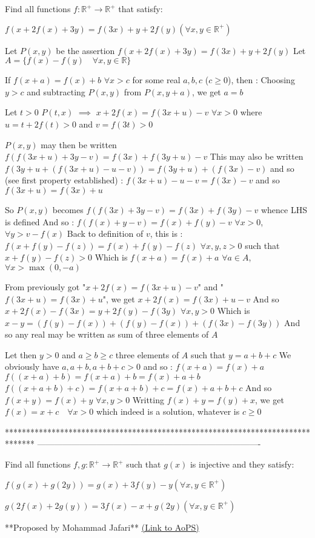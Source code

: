 \begin{solution}
	\begin{tcolorbox}Find all functions $f: \mathbb{R}^{+} \to \mathbb{R}^{+}$ that satisfy:

$f(x+2f(x)+3y)=f(3x)+y+2f(y) (\forall x,y \in \mathbb{R}^{+})$\end{tcolorbox}
Let $P(x,y)$ be the assertion $f(x+2f(x)+3y)=f(3x)+y+2f(y)$
Let $A=\{f(x)-f(y)\quad\forall x,y\in\mathbb R\}$

If $f(x+a)=f(x)+b$ $\forall x>c$ for some real $a,b,c$ ($c\ge 0$), then :
Choosing $y>c$ and subtracting $P(x,y)$ from $P(x,y+a)$, we get $a=b$

Let $t>0$
$P(t,x)$ $\implies$ $x+2f(x)=f(3x+u)-v$ $\forall x>0$ where $u=t+2f(t)>0$ and $v=f(3t)>0$

$P(x,y)$ may then be written $f(f(3x+u)+3y-v)=f(3x)+f(3y+u)-v$
This may also be written $f(3y+u +(f(3x+u)-u-v))=f(3y+u)+(f(3x)-v)$ and so (see first property established) :
$f(3x+u)-u-v=f(3x)-v$ and so $f(3x+u)=f(3x)+u$

So $P(x,y)$ becomes $f(f(3x)+3y-v)=f(3x)+f(3y)-v$ whence LHS is defined
And so : $f(f(x)+y-v)=f(x)+f(y)-v$ $\forall x>0$, $\forall y>v-f(x)$
Back to definition of $v$, this is :
$f(x+f(y)-f(z))=f(x)+f(y)-f(z)$ $\forall x,y,z>0$ such that $x+f(y)-f(z)>0$
Which is $f(x+a)=f(x)+a$ $\forall a\in A$, $\forall x>\max(0,-a)$

From previously got "$x+2f(x)=f(3x+u)-v$" and "$f(3x+u)=f(3x)+u$", we get $x+2f(x)=f(3x)+u-v$
And so $x+2f(x)-f(3x)=y+2f(y)-f(3y)$ $\forall x,y>0$
Which is $x-y=(f(y)-f(x))+(f(y)-f(x))+(f(3x)-f(3y))$ 
And so any real may be written as sum of three elements of $A$

Let then $y>0$ and $a\ge b\ge c$ three elements of $A$ such that $y=a+b+c$
We obviously have $a,a+b,a+b+c>0$ and so :
$f(x+a)=f(x)+a$
$f((x+a)+b)=f(x+a)+b=f(x)+a+b$
$f((x+a+b)+c)=f(x+a+b)+c=f(x)+a+b+c$
And so $f(x+y)=f(x)+y$ $\forall x,y>0$
Writting $f(x)+y=f(y)+x$, we get 
$\boxed{f(x)=x+c\quad\forall x>0}$ which indeed is a solution, whatever is $c\ge 0$



\end{solution}
*******************************************************************************
-------------------------------------------------------------------------------

\begin{problem}
	Find all functions $f,g:\mathbb{R}^{+} \to \mathbb{R}^{+}$ such that $g(x)$ is injective and they satisfy:

$f(g(x)+g(2y))=g(x)+3f(y)-y(\forall x,y \in \mathbb{R}^{+})$

$g(2f(x)+2g(y))=3f(x)-x+g(2y) (\forall x,y \in \mathbb{R}^{+})$

**Proposed by Mohammad Jafari**
	\flushright \href{https://artofproblemsolving.com/community/c6h1611718}{(Link to AoPS)}
\end{problem}




